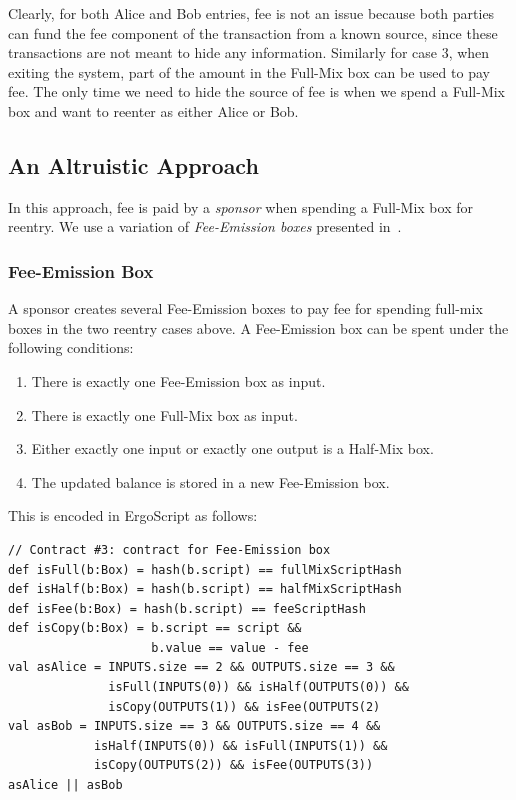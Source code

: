 \documentclass[11pt]{article}
\newcommand{\langname}{ErgoScript\xspace}
\begin{document}
Clearly, for both Alice and Bob entries, fee is not an issue because both parties can fund the fee component of the transaction from a known source, since these transactions are not meant to hide any information. Similarly for case 3, when exiting the system, part of the amount in the Full-Mix box can be used to pay fee. The only time we need to hide the source of fee is when we spend a Full-Mix box and want to reenter as either Alice or Bob. 

\subsection{An Altruistic Approach}
\label{donation}

In this approach, fee is paid by a {\em sponsor} when spending a Full-Mix box for reentry. 
We use a variation of {\em Fee-Emission boxes} presented in~\cite{Fee-Emission}. 

\subsubsection{Fee-Emission Box}
A sponsor creates several Fee-Emission boxes to pay fee for spending full-mix boxes in the two reentry cases above. A Fee-Emission box can be spent under the following conditions:

\begin{enumerate}
    \item There is exactly one Fee-Emission box as input.
    \item There is exactly one Full-Mix box as input.
    \item Either exactly one input or exactly one output is a Half-Mix box.
    \item The updated balance is stored in a new Fee-Emission box.
\end{enumerate}

This is encoded in \langname as follows:

{\small
\begin{Verbatim}[frame=single]
// Contract #3: contract for Fee-Emission box
def isFull(b:Box) = hash(b.script) == fullMixScriptHash 
def isHalf(b:Box) = hash(b.script) == halfMixScriptHash
def isFee(b:Box) = hash(b.script) == feeScriptHash
def isCopy(b:Box) = b.script == script && 
                    b.value == value - fee
val asAlice = INPUTS.size == 2 && OUTPUTS.size == 3 &&
              isFull(INPUTS(0)) && isHalf(OUTPUTS(0)) &&
              isCopy(OUTPUTS(1)) && isFee(OUTPUTS(2)
val asBob = INPUTS.size == 3 && OUTPUTS.size == 4 &&
            isHalf(INPUTS(0)) && isFull(INPUTS(1)) &&
            isCopy(OUTPUTS(2)) && isFee(OUTPUTS(3))
asAlice || asBob 
\end{Verbatim}
}
\end{document}

